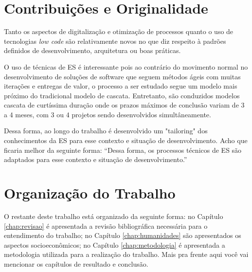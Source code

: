 	\section{Contribuições e Originalidade}\label{sec:introducao:contribuicoes}

		Tanto os aspectos de digitalização e otimização de processos quanto o uso de tecnologias \textit{low code} são relativamente novos no que diz respeito à padrões definidos
		de desenvolvimento, arquitetura ou boas práticas.

		O uso de técnicas de ES é interessante pois ao contrário do movimento normal no desenvolvimento de soluções de software que seguem métodos ágeis com muitas iterações e entregas
		de valor, o processo a ser estudado segue um modelo mais próximo do tradicional modelo de cascata. Entretanto, são conduzidos modelos cascata de curtíssima duração onde os prazos
		máximos de conclusão variam de 3 a 4 meses, com 3 ou 4 projetos sendo desenvolvidos simultâneamente.

		Dessa forma, ao longo do trabalho é desenvolvido um "tailoring" dos conhecimentos da ES para esse contexto e situação de desenvolvimento. {\color{red} Acho que ficaria melhor da seguinte forma: ``Dessa forma, os processos técnicos de ES são adaptados para esse contexto e situação de desenvolvimento.''}
	
	\section{Organização do Trabalho}\label{sec:introducao:organizacao}

		O restante deste trabalho está organizado da seguinte forma: no Capítulo \ref{chap:revisao} é apresentada a revisão bibliográfica necessária para o entendimento do trabalho; no Capítulo \ref{chap:humanidades} são apresentados os aspectos socioeconômicos; no Capítulo \ref{chap:metodologia} é apresentada a metodologia utilizada para a realização do trabalho. {\color{red} Mais pra frente aqui você vai mencionar os capítulos de resultado e conclusão.}
		
